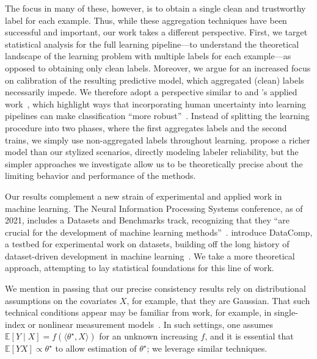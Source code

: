 \documentclass[11pt]{article}
\newcommand{\E}{\mathbb{E}}
\newcommand{\<}{\langle} %
\renewcommand{\>}{\rangle}
\newcommand{\opt}{^\star}
\begin{document}
The focus in many of these, however, is to obtain a single  clean
and trustworthy label for each example. Thus, while these
aggregation techniques have been successful and important, our work takes a
different perspective.  First, we target statistical analysis for
the full learning pipeline---to understand the theoretical landscape of the
learning problem with multiple labels for each example---as opposed to
obtaining only clean labels. Moreover, we argue for an increased focus on
calibration of the resulting predictive model, which aggregated (clean)
labels necessarily impede. We therefore adopt a perspective similar to
\citeauthor{PetersonBaGrRu19} and \citeauthor{PlataniosAlXiMi20}'s
applied work~\citep{PetersonBaGrRu19,PlataniosAlXiMi20},
which highlight ways that incorporating human
uncertainty into learning pipelines can make classification ``more
robust''~\citep{PetersonBaGrRu19}.  Instead of splitting the learning
procedure into two phases, where the first aggregates labels and the second
trains, we simply use non-aggregated labels throughout
learning. \citet{PlataniosAlXiMi20} propose a richer model than our stylized
scenarios, directly modeling labeler reliability, but the
simpler approaches we investigate allow us to be theoretically precise about
the limiting behavior and performance of the methods.


Our results complement a new strain of experimental and applied work in
machine learning.  The Neural Information Processing Systems conference, as
of 2021, includes a Datasets and Benchmarks track, recognizing that they
``are crucial for the development of machine learning
methods''~\cite{BeygelzimerLiVaDa21}. \citet{GadreEtAl23} introduce
DataComp, a testbed for experimental work on datasets, building off the long
history of dataset-driven development in machine learning~\cite{HardtRe22}.
We take a more theoretical approach, attempting to lay statistical
foundations for this line of work.

We mention in passing that our precise consistency results rely on
distributional assumptions on the covariates $X$, for example, that they are
Gaussian. That such technical conditions appear may be familiar from work,
for example, in single-index or nonlinear measurement models~\cite{PlanVe16,
  PlanVe13}. In such settings, one assumes $\E[Y \mid X] = f(\<\theta\opt,
X\>)$ for an unknown increasing $f$, and it is essential that $\E[Y X]
\propto \theta\opt$ to allow estimation of $\theta\opt$; we leverage similar
techniques.
\end{document}
